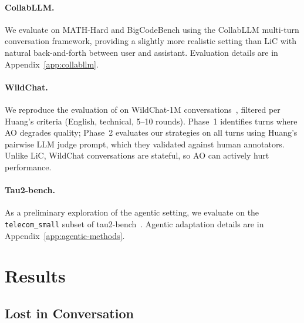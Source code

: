 \documentclass{article} %
\begin{document}
\paragraph{CollabLLM.}
We evaluate on MATH-Hard and BigCodeBench using the CollabLLM multi-turn conversation framework, providing a slightly more realistic setting than LiC with natural back-and-forth between user and assistant. Evaluation details are in Appendix~\ref{app:collabllm}.

\paragraph{WildChat.}
We reproduce the evaluation of \citet{huang2026context} on WildChat-1M conversations~\citep{zhao2024wildchat}, filtered per Huang's criteria (English, technical, 5--10 rounds). Phase~1 identifies turns where AO degrades quality; Phase~2 evaluates our strategies on all turns using Huang's pairwise LLM judge prompt, which they validated against human annotators. Unlike LiC, WildChat conversations are stateful, so AO can actively hurt performance.

\paragraph{Tau2-bench.}
As a preliminary exploration of the agentic setting, we evaluate on the \texttt{telecom\_small} subset of tau2-bench~\citep{yao2024tau}. Agentic adaptation details are in Appendix~\ref{app:agentic-methods}.

\section{Results}
\label{sec:results}

\subsection{Lost in Conversation}
\label{sec:lic-results}
\end{document}

